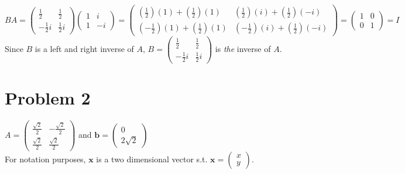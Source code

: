 \documentclass[fleqn]{article}
\begin{document}
$BA=\begin{pmatrix}\frac{1}{2} & \frac{1}{2}\\ -\frac{1}{2}i & \frac{1}{2}i\end{pmatrix}\begin{pmatrix}1 & i \\ 1 & -i\end{pmatrix}=\begin{pmatrix}(\frac{1}{2})(1)+(\frac{1}{2})(1) & (\frac{1}{2})(i)+(\frac{1}{2})(-i) \\ (-\frac{1}{2})(1)+(\frac{1}{2})(1) & (-\frac{1}{2})(i)+(\frac{1}{2})(-i) \end{pmatrix} = \begin{pmatrix}1 & 0 \\ 0 & 1\end{pmatrix} = I$\\
Since $B$ is a left and right inverse of $A$, $B=\begin{pmatrix}\frac{1}{2} & \frac{1}{2}\\ -\frac{1}{2}i & \frac{1}{2}i\end{pmatrix}$ is \textit{the} inverse of $A.$
\pagebreak
\section*{Problem 2}
$A = \begin{pmatrix}\frac{\sqrt{2}}{2} & -\frac{\sqrt{2}}{2}\\ \frac{\sqrt{2}}{2} & \frac{\sqrt{2}}{2}\end{pmatrix}$ and $\textbf{b} = \begin{pmatrix}0 \\ 2\sqrt{2}\end{pmatrix}$\\
For notation purposes, $\textbf{x}$ is a two dimensional vector s.t. $\textbf{x}=\begin{pmatrix}x \\ y\end{pmatrix}$.
\end{document}
